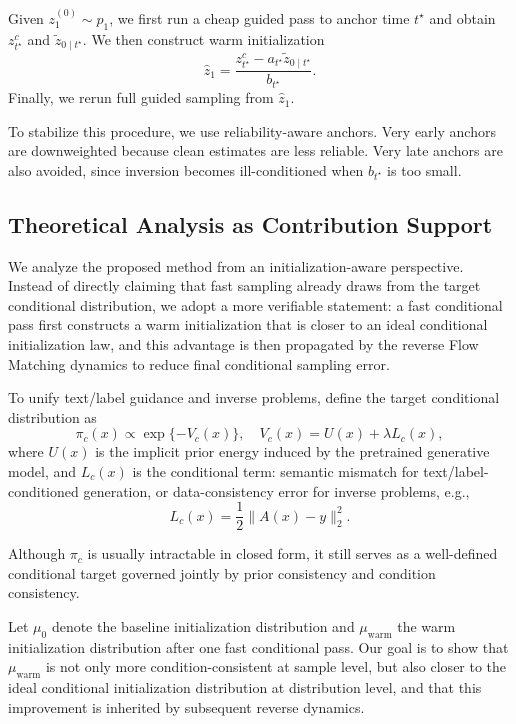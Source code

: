 \documentclass[letterpaper]{article} %
\begin{document}
Given $z_1^{(0)}\sim p_1$, we first run a cheap guided pass to anchor time $t^\star$ and obtain $z_{t^\star}^{c}$ and $\tilde z_{0\mid t^\star}$. We then construct warm initialization
\begin{equation}
\hat{z}_1 = \frac{z_{t^\star}^{c} - a_{t^\star}\tilde{z}_{0 \mid t^\star}}{b_{t^\star}}.
\end{equation}
Finally, we rerun full guided sampling from $\hat z_1$.

To stabilize this procedure, we use reliability-aware anchors.
Very early anchors are downweighted because clean estimates are less reliable.
Very late anchors are also avoided, since inversion becomes ill-conditioned when $b_{t^\star}$ is too small.

\subsection{Theoretical Analysis as Contribution Support}

We analyze the proposed method from an initialization-aware perspective. Instead of directly claiming that fast sampling already draws from the target conditional distribution, we adopt a more verifiable statement: a fast conditional pass first constructs a warm initialization that is closer to an ideal conditional initialization law, and this advantage is then propagated by the reverse Flow Matching dynamics to reduce final conditional sampling error.

To unify text/label guidance and inverse problems, define the target conditional distribution as
\begin{equation}
\pi_c(x) \propto \exp\{-V_c(x)\}, \quad V_c(x)=U(x)+\lambda L_c(x),
\end{equation}
where $U(x)$ is the implicit prior energy induced by the pretrained generative model, and $L_c(x)$ is the conditional term: semantic mismatch for text/label-conditioned generation, or data-consistency error for inverse problems, e.g.,
\begin{equation}
L_c(x)=\frac{1}{2}\|A(x)-y\|_2^2.
\end{equation}

Although $\pi_c$ is usually intractable in closed form, it still serves as a well-defined conditional target governed jointly by prior consistency and condition consistency.

Let $\mu_0$ denote the baseline initialization distribution and $\mu_{\mathrm{warm}}$ the warm initialization distribution after one fast conditional pass. Our goal is to show that $\mu_{\mathrm{warm}}$ is not only more condition-consistent at sample level, but also closer to the ideal conditional initialization distribution at distribution level, and that this improvement is inherited by subsequent reverse dynamics.
\end{document}
